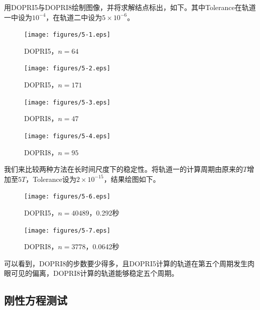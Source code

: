\documentclass[lang=cn,10pt,bibend=bibtex]{elegantbook}
\begin{document}
用DOPRI5与DOPRI8绘制图像，并将求解结点标出，如下。其中Tolerance在轨道一中设为$10^{-4}$，在轨道二中设为$5\times 10^{-6}$。

\begin{figure}[H]
  \centering
  \begin{minipage}[t]{0.34\linewidth}
      \centering
      \texttt{[image: figures/5-1.eps]}
      \caption*{\small DOPRI5，$n=64$}
  \end{minipage}
  \hspace{1em}
  \begin{minipage}[t]{0.34\linewidth}
      \centering
      \texttt{[image: figures/5-2.eps]}
      \caption*{\small DOPRI5，$n=171$}
  \end{minipage}
\end{figure}

\begin{figure}[H]
  \centering
  \begin{minipage}[t]{0.34\linewidth}
      \centering
      \texttt{[image: figures/5-3.eps]}
      \caption*{\small DOPRI8，$n=47$}
  \end{minipage}
  \hspace{1em}
  \begin{minipage}[t]{0.34\linewidth}
      \centering
      \texttt{[image: figures/5-4.eps]}
      \caption*{\small DOPRI8，$n=95$}
  \end{minipage}
\end{figure}

我们来比较两种方法在长时间尺度下的稳定性。将轨道一的计算周期由原来的$T$增加至$5T$，Tolerance设为$2\times 10^{-15}$，结果绘图如下。

\begin{figure}[H]
  \centering
  \begin{minipage}[t]{0.34\linewidth}
      \centering
      \texttt{[image: figures/5-6.eps]}
      \caption*{\small DOPRI5，$n=40489$，0.292秒}
  \end{minipage}
  \hspace{1em}
  \begin{minipage}[t]{0.34\linewidth}
      \centering
      \texttt{[image: figures/5-7.eps]}
      \caption*{\small DOPRI8，$n=3778$，0.0642秒}
  \end{minipage}
\end{figure}

可以看到，DOPRI8的步数要少得多，且DOPRI5计算的轨道在第五个周期发生肉眼可见的偏离，DOPRI8计算的轨道能够稳定五个周期。

\subsection{刚性方程测试}
\end{document}

